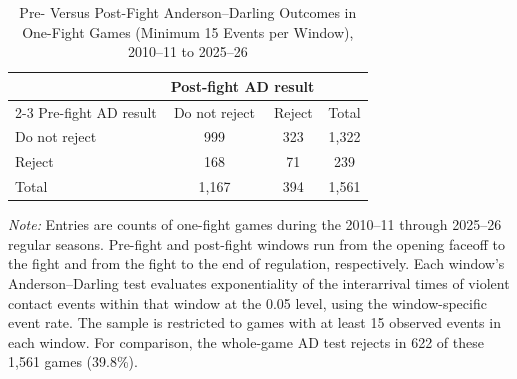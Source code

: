 \begin{table}[htbp]
\centering
\caption{Pre- Versus Post-Fight Anderson--Darling Outcomes in One-Fight Games (Minimum 15 Events per Window), 2010--11 to 2025--26}
\label{tab:one_fight_AD_rejection_min_15_20102011_20252026}
\small
\renewcommand{\arraystretch}{1.15}
\setlength{\tabcolsep}{6pt}

\begin{tabular*}{0.78\textwidth}{@{\extracolsep{\fill}}lccc}
\toprule
 & \multicolumn{2}{c}{Post-fight AD result} & \\
\cmidrule(lr){2-3}
Pre-fight AD result & Do not reject & Reject & Total \\
\midrule
Do not reject & 999 & 323 & 1,322 \\
Reject & 168 & 71 & 239 \\
\midrule
Total & 1,167 & 394 & 1,561 \\
\bottomrule
\end{tabular*}

\vspace{0.4em}
\parbox{0.78\textwidth}{
\footnotesize
\textit{Note:} Entries are counts of one-fight games during the 2010--11 through 2025--26 regular seasons. Pre-fight and post-fight windows run from the opening faceoff to the fight and from the fight to the end of regulation, respectively. Each window's Anderson--Darling test evaluates exponentiality of the interarrival times of violent contact events within that window at the 0.05 level, using the window-specific event rate. The sample is restricted to games with at least 15 observed events in each window. For comparison, the whole-game AD test rejects in 622 of these 1,561 games (39.8\%).
}
\end{table}
